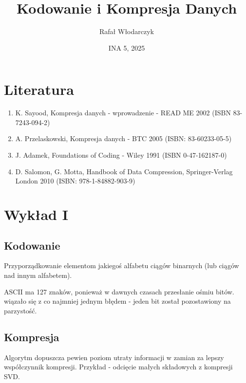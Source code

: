 \documentclass{article}
\title{Kodowanie i Kompresja Danych}
\author{Rafał Włodarczyk}
\date{INA 5, 2025}
\numberwithin{equation}{subsection}
\newenvironment{definition}[1]{%
    \trivlist
    \item[\hskip\labelsep\textbf{Definition. #1.}]
    \ignorespaces
}{%
    \endtrivlist
}
\newenvironment{information}[1]{%
    \trivlist
    \item[\hskip\labelsep\textbf{Information. #1.}]
    \ignorespaces
}{%
    \endtrivlist
}
\begin{document}
\maketitle

\tableofcontents

\newpage

\section{Literatura}

\begin{enumerate}
    \item K. Sayood, Kompresja danych - wprowadzenie - READ ME 2002 (ISBN 83-7243-094-2)
    \item A. Przelaskowski, Kompresja danych - BTC 2005 (ISBN: 83-60233-05-5)
    \item J. Adamek, Foundations of Coding - Wiley 1991 (ISBN 0-47-162187-0)
    \item D. Salomon, G. Motta, Handbook of Data Compression, Springer-Verlag London 2010 (ISBN: 978-1-84882-903-9)
\end{enumerate}

\section{Wykład I}

\subsection{Kodowanie}

\begin{definition}{Kodowanie}
    Przyporządkowanie elementom jakiegoś alfabetu ciągów binarnych (lub ciągów nad innym alfabetem).
\end{definition}

\begin{information}{Początki ASCII}
    ASCII ma 127 znaków, ponieważ w dawnych czasach przesłanie ośmiu bitów.
    wiązało się z co najmniej jednym błędem - jeden bit został pozostawiony na parzystość.
\end{information}

\subsection{Kompresja}

\begin{definition}{Kompresja Stratna}
    Algorytm dopuszcza pewien poziom utraty informacji w zamian za lepszy współczynnik kompresji.
    Przykład - odcięcie małych składowych z kompresji SVD.
\end{definition}
\end{document}

